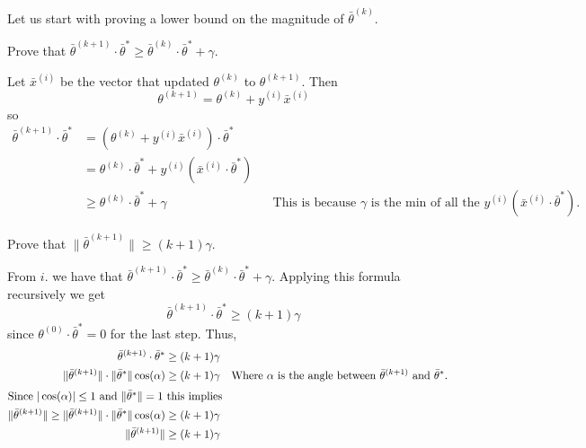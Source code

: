 \documentclass[12pt, letterpaper]{article}
\newenvironment{subsubproblem}[1]{%
  \begin{sspb}{#1}
    }{
  \end{sspb}
}
\renewcommand{\t}[1]{\text{#1}}
\begin{document}
\begin{subproblem}{}
    Let us start with proving a lower bound on the magnitude of $\bar{\theta}^{(k)}$.
\end{subproblem}
\begin{subsubproblem}{}
    Prove that $\bar{\theta}^{(k+1)} \cdot \bar{\theta}^* \geq \bar{\theta}^{(k)} \cdot \bar{\theta}^* + \gamma$.
\end{subsubproblem}
\begin{problemproof}
    Let $\bar{x}^{(i)}$ be the vector that updated $\theta^{(k)}$ to $\theta^{(k+1)}$. Then
    \[\theta^{(k+1)} = \theta^{(k)} + y^{(i)}\bar{x}^{(i)}\]
    so
    \begin{align*}
        \bar{\theta}^{(k+1)} \cdot \bar{\theta}^*
        &=(\theta^{(k)} + y^{(i)}\bar{x}^{(i)}) \cdot \bar{\theta}^*\\
        &=\theta^{(k)} \cdot \bar{\theta}^* + y^{(i)}(\bar{x}^{(i)}\cdot \bar{\theta}^*)\\
        &\geq \theta^{(k)} \cdot \bar{\theta}^* + \gamma 
        && \t{This is because } \gamma \t{ is the min of all the } y^{(i)}(\bar{x}^{(i)}\cdot \bar{\theta}^*).
    \end{align*}
\end{problemproof}

\begin{subsubproblem}{}
    Prove that  $\|\bar{\theta}^{(k+1)}\| \geq (k+1)\gamma$.
\end{subsubproblem}
\begin{problemproof}
    From $i.$ we have that $\bar{\theta}^{(k+1)} \cdot \bar{\theta}^* \geq \bar{\theta}^{(k)} \cdot \bar{\theta}^* + \gamma$. 
    Applying this formula recursively we get 
    \[\bar{\theta}^{(k+1)} \cdot \bar{\theta}^* \geq (k+1)\gamma\] since $\theta^{(0)} \cdot \bar{\theta}^* = 0$ for the last step. Thus,
    \begin{align*}
        \bar{\theta}^{(k+1)} \cdot \bar{\theta}^* 
        &\geq (k+1)\gamma\\
        \|\bar{\theta}^{(k+1)}\| \cdot \|\bar{\theta}^*\| \cos(\alpha)
        &\geq (k+1)\gamma && \t{Where } \alpha \t{ is the angle between } \bar{\theta}^{(k+1)} \t{ and } \bar{\theta}^*.\\
        \intertext{Since $|\cos(\alpha)| \leq 1$ and $\|\bar{\theta}^*\| = 1$ this implies}
        \|\bar{\theta}^{(k+1)}\| \geq \|\bar{\theta}^{(k+1)}\| \cdot \|\bar{\theta}^*\| \cos(\alpha)
        &\geq (k+1)\gamma\\
        \|\bar{\theta}^{(k+1)}\| &\geq (k+1)\gamma
    \end{align*}
\end{problemproof}
\end{document}
